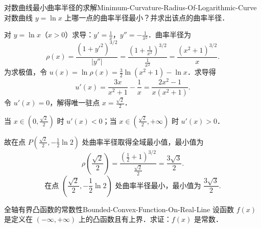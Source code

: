 \begin{problem}{对数曲线最小曲率半径的求解}{Minimum-Curvature-Radius-Of-Logarithmic-Curve}
    对数曲线 $y = \ln x$ 上哪一点的曲率半径最小？并求出该点的曲率半径．
\end{problem}

\begin{solution}
    对 $y = \ln x$（$x > 0$）求导：$y' = \frac{1}{x}$，$y'' = -\frac{1}{x^2}$．曲率半径为
    \begin{equation}
        \rho(x) = \frac{(1 + y'^2)^{3/2}}{|y''|} = \frac{\left( 1 + \frac{1}{x^2} \right)^{3/2}}{\frac{1}{x^2}} = \frac{(x^2 + 1)^{3/2}}{x}.
    \end{equation}
    为求极值，令 $u(x) = \ln \rho(x) = \frac{3}{2}\ln(x^2 + 1) - \ln x$．求导得
    \begin{equation}
        u'(x) = \frac{3x}{x^2 + 1} - \frac{1}{x} = \frac{2x^2 - 1}{x(x^2 + 1)}.
    \end{equation}
    令 $u'(x) = 0$，解得唯一驻点 $x = \frac{\sqrt{2}}{2}$．

    当 $x \in \left(0, \frac{\sqrt{2}}{2}\right)$ 时 $u'(x) < 0$；当 $x \in \left(\frac{\sqrt{2}}{2}, +\infty\right)$ 时 $u'(x) > 0$．

    故在点 $P\left( \frac{\sqrt{2}}{2}, -\frac{1}{2}\ln 2 \right)$ 处曲率半径取得全域最小值，最小值为
    \begin{equation}
        \rho\left(\frac{\sqrt{2}}{2}\right) = \frac{\left(\frac{1}{2} + 1\right)^{3/2}}{\frac{\sqrt{2}}{2}} = \frac{3\sqrt{3}}{2}.
    \end{equation}
    \begin{equation}
        \boxed{\text{在点 } \left( \frac{\sqrt{2}}{2}, -\frac{1}{2}\ln 2 \right) \text{ 处曲率半径最小，最小值为 } \frac{3\sqrt{3}}{2}.}
    \end{equation}
\end{solution}

\begin{problem}{全轴有界凸函数的常数性}{Bounded-Convex-Function-On-Real-Line}
    设函数 $f(x)$ 是定义在 $(-\infty, +\infty)$ 上的凸函数且有上界．求证：$f(x)$ 是常数．
\end{problem}

